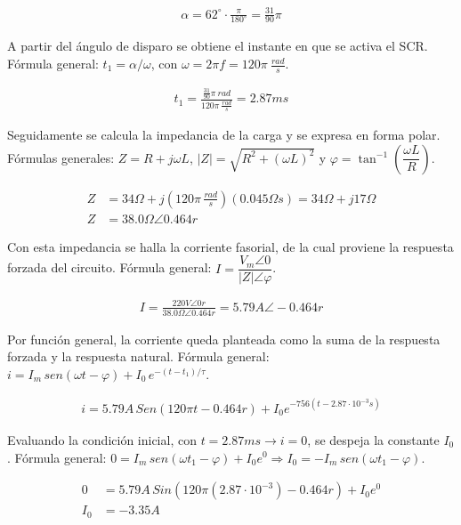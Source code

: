 \documentclass[11pt]{article}
\begin{document}
\begin{align*}
\alpha = 62^\circ\cdot\frac{\pi}{180^\circ} = \boxed{\tfrac{31}{90}\pi}
\end{align*}

A partir del \'angulo de disparo se obtiene el instante en que se activa el SCR.
F\'ormula general: $t_1 = \alpha/\omega$, con $\omega = 2\pi f = 120\pi\ \frac{rad}{s}$.

\begin{align*}
t_1 = \frac{\frac{31}{90}\pi\ rad}{120\pi\ \frac{rad}{s}} = \boxed{2.87ms}
\end{align*}

Seguidamente se calcula la impedancia de la carga y se expresa en forma polar.
F\'ormulas generales: $Z = R + j\omega L$, $|Z| = \sqrt{R^2 + (\omega L)^2}$ y
$\varphi = \tan^{-1}\!\left(\dfrac{\omega L}{R}\right)$.

\begin{align*}
Z &= 34\Omega + j(120\pi\,\tfrac{rad}{s})(0.045\Omega s) = \boxed{34\Omega + j17\Omega} \\
Z &= \boxed{38.0\Omega\angle 0.464r}
\end{align*}

Con esta impedancia se halla la corriente fasorial, de la cual proviene la
respuesta forzada del circuito. F\'ormula general:
$I = \dfrac{V_m\angle 0}{|Z|\angle\varphi}$.

\begin{align*}
I = \frac{220V\angle 0r}{38.0\Omega\angle 0.464r} = \boxed{5.79A\angle -0.464r}
\end{align*}

Por funci\'on general, la corriente queda planteada como la suma de la respuesta
forzada y la respuesta natural. F\'ormula general:
$i = I_m\,sen(\omega t - \varphi) + I_0\,e^{-(t-t_1)/\tau}$.

\begin{align*}
i = 5.79A\,Sen(120\pi t - 0.464r) + I_0 e^{-756(t-2.87\cdot10^{-3}s)}
\end{align*}

Evaluando la condici\'on inicial, con $t=2.87ms \rightarrow i=0$, se despeja la
constante $I_0$. F\'ormula general:
$0 = I_m\,sen(\omega t_1 - \varphi) + I_0 e^0 \Rightarrow I_0 = -I_m\,sen(\omega t_1 - \varphi)$.

\begin{align*}
0 &= 5.79A\,Sin(120\pi(2.87\cdot10^{-3}) - 0.464r) + I_0 e^{0} \\
I_0 &= \boxed{-3.35A}
\end{align*}
\end{document}
